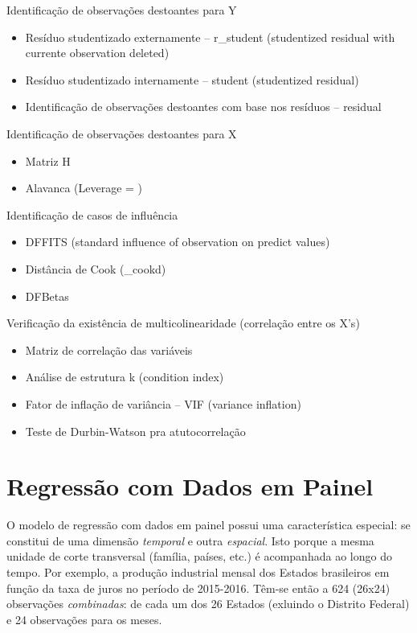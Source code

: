\documentclass[12pt,brazil,oneside]{book}
\providecommand{\tightlist}{%
  \setlength{\itemsep}{0pt}\setlength{\parskip}{0pt}}
\begin{document}
Identificação de observações destoantes para Y

\begin{itemize}
\tightlist
\item
  Resíduo studentizado externamente -- r\_student (studentized residual
  with currente observation deleted)
\item
  Resíduo studentizado internamente -- student (studentized residual)
\item
  Identificação de observações destoantes com base nos resíduos --
  residual
\end{itemize}

Identificação de observações destoantes para X

\begin{itemize}
\tightlist
\item
  Matriz H
\item
  Alavanca (Leverage = )
\end{itemize}

Identificação de casos de influência

\begin{itemize}
\tightlist
\item
  DFFITS (standard influence of observation on predict values)
\item
  Distância de Cook (\_cookd)
\item
  DFBetas
\end{itemize}

Verificação da existência de multicolinearidade (correlação entre os
X's)

\begin{itemize}
\tightlist
\item
  Matriz de correlação das variáveis
\item
  Análise de estrutura k (condition index)
\item
  Fator de inflação de variância -- VIF (variance inflation)
\item
  Teste de Durbin-Watson pra atutocorrelação
\end{itemize}

\hypertarget{regressao-com-dados-em-painel}{%
\chapter{Regressão com Dados em
Painel}\label{regressao-com-dados-em-painel}}

O modelo de regressão com dados em painel possui uma característica
especial: se constitui de uma dimensão \emph{temporal} e outra
\emph{espacial}. Isto porque a mesma unidade de corte transversal
(família, países, etc.) é acompanhada ao longo do tempo. Por exemplo, a
produção industrial mensal dos Estados brasileiros em função da taxa de
juros no período de 2015-2016. Têm-se então a 624 (26x24) observações
\emph{combinadas}: de cada um dos 26 Estados (exluindo o Distrito
Federal) e 24 observações para os meses.
\end{document}
